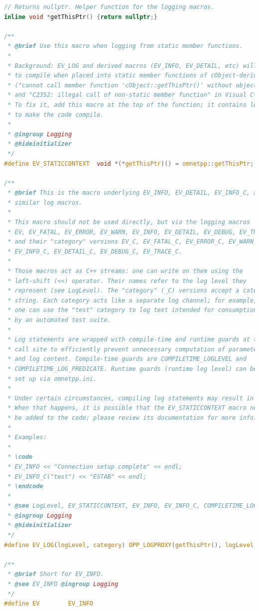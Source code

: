 \begin{lstlisting}[language=c]
// Returns nullptr. Helper function for the logging macros.
inline void *getThisPtr() {return nullptr;}

/**
 * @brief Use this macro when logging from static member functions.
 *
 * Background: EV_LOG and derived macros (EV_INFO, EV_DETAIL, etc) will fail
 * to compile when placed into static member functions of cObject-derived classes
 * ("cannot call member function 'cObject::getThisPtr()' without object" in GNU C++,
 * and "C2352: illegal call of non-static member function" in Visual C++).
 * To fix it, add this macro at the top of the function; it contains local declarations
 * to make the code compile.
 *
 * @ingroup Logging
 * @hideinitializer
 */
#define EV_STATICCONTEXT  void *(*getThisPtr)() = omnetpp::getThisPtr;

/**
 * @brief This is the macro underlying EV_INFO, EV_DETAIL, EV_INFO_C, and
 * similar log macros.
 *
 * This macro should not be used directly, but via the logging macros
 * EV, EV_FATAL, EV_ERROR, EV_WARN, EV_INFO, EV_DETAIL, EV_DEBUG, EV_TRACE,
 * and their "category" versions EV_C, EV_FATAL_C, EV_ERROR_C, EV_WARN_C,
 * EV_INFO_C, EV_DETAIL_C, EV_DEBUG_C, EV_TRACE_C.
 *
 * Those macros act as C++ streams: one can write on them using the
 * left-shift (<<) operator. Their names refer to the log level they
 * represent (see LogLevel). The "category" (_C) versions accept a category
 * string. Each category acts like a separate log channel; for example,
 * one can use the "test" category to log text intended for consumption
 * by an automated test suite.
 *
 * Log statements are wrapped with compile-time and runtime guards at the
 * call site to efficiently prevent unnecessary computation of parameters
 * and log content. Compile-time guards are COMPILETIME_LOGLEVEL and
 * COMPILETIME_LOG_PREDICATE. Runtime guards (runtime log level) can be
 * set up via omnetpp.ini.
 *
 * Under certain circumstances, compiling log statements may result in errors.
 * When that happens, it is possible that the EV_STATICCONTEXT macro needs to
 * be added to the code; please review its documentation for more info.
 *
 * Examples:
 *
 * \code
 * EV_INFO << "Connection setup complete" << endl;
 * EV_INFO_C("test") << "ESTAB" << endl;
 * \endcode
 *
 * @see LogLevel, EV_STATICCONTEXT, EV_INFO, EV_INFO_C, COMPILETIME_LOGLEVEL, COMPILETIME_LOG_PREDICATE
 * @ingroup Logging
 * @hideinitializer
 */
#define EV_LOG(logLevel, category) OPP_LOGPROXY(getThisPtr(), logLevel, category).getStream()

/**
 * @brief Short for EV_INFO.
 * @see EV_INFO @ingroup Logging
 */
#define EV        EV_INFO


\end{lstlisting}
